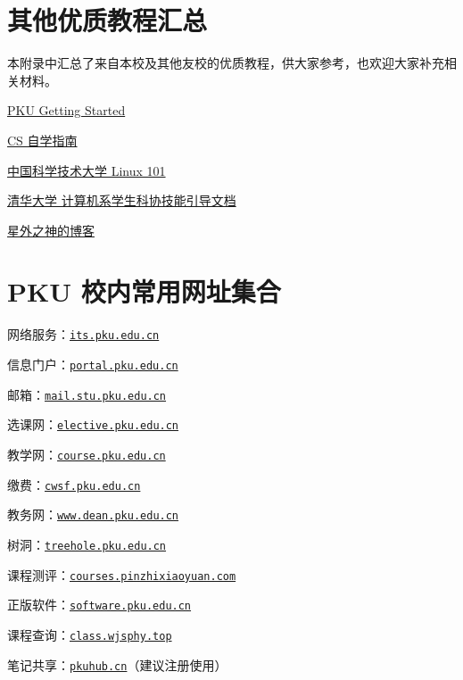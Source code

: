 \chapter{其他优质教程汇总}

本附录中汇总了来自本校及其他友校的优质教程，供大家参考，也欢迎大家补充相关材料。

\href{https://missing.lcpu.dev}{PKU Getting Started}

\href{https://csdiy.wiki/}{CS 自学指南}

\href{https://101.lug.ustc.edu.cn/}{中国科学技术大学 Linux 101}

\href{https://docs.net9.org/}{清华大学 计算机系学生科协技能引导文档}

\href{https://wszqkzqk.github.io/tags}{星外之神的博客}

\chapter{PKU 校内常用网址集合}

网络服务：\href{its.pku.edu.cn}{\texttt{its.pku.edu.cn}}

信息门户：\href{portal.pku.edu.cn}{\texttt{portal.pku.edu.cn}}

邮箱：\href{mail.stu.pku.edu.cn}{\texttt{mail.stu.pku.edu.cn}}

选课网：\href{elective.pku.edu.cn}{\texttt{elective.pku.edu.cn}}

教学网：\href{course.pku.edu.cn}{\texttt{course.pku.edu.cn}}

缴费：\href{cwsf.pku.edu.cn}{\texttt{cwsf.pku.edu.cn}}

教务网：\href{www.dean.pku.edu.cn}{\texttt{www.dean.pku.edu.cn}}

树洞：\href{treehole.pku.edu.cn}{\texttt{treehole.pku.edu.cn}}

课程测评：\href{courses.pinzhixiaoyuan.com}{\texttt{courses.pinzhixiaoyuan.com}}

正版软件：\href{software.pku.edu.cn}{\texttt{software.pku.edu.cn}}

课程查询：\href{https://class.wjsphy.top/}{\texttt{class.wjsphy.top}}

笔记共享：\href{https://pkuhub.cn/}{\texttt{pkuhub.cn}}（建议注册使用）